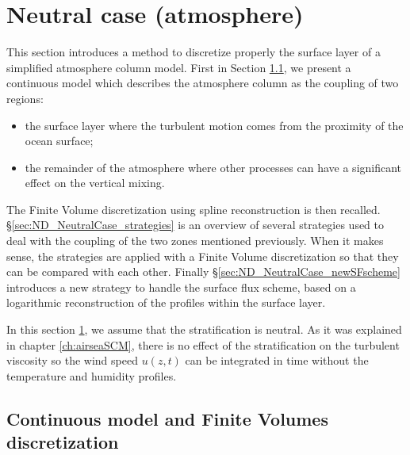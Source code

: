 \section{Neutral case (atmosphere)}
\label{sec:ND_NeutralCase}
This section introduces a method to discretize properly
the surface layer of a simplified atmosphere column model.
First in Section \ref{sec:ND_NeutralCase_continuousModel},
we present a continuous model which describes the atmosphere
column as the coupling of two regions:
\begin{itemize}
		\item the surface layer where the turbulent motion
			comes from the proximity of the ocean surface;
		\item the remainder of the atmosphere where other
			processes can have a significant effect
			on the vertical mixing.
\end{itemize}
The Finite Volume discretization using spline reconstruction
is then recalled.
\S \ref{sec:ND_NeutralCase_strategies}
is an overview of several strategies used to deal
with the coupling of the two zones mentioned previously.
When it makes sense, the strategies are applied with a
Finite Volume discretization so that they can be
compared with each other.
Finally \S \ref{sec:ND_NeutralCase_newSFscheme}
introduces a new strategy to handle the surface flux scheme,
based on a logarithmic reconstruction of the profiles
within the surface layer.
\par
In this section \ref{sec:ND_NeutralCase},
we assume that the stratification is neutral.
As it was explained in chapter \ref{ch:airseaSCM},
there is no effect of the stratification on the turbulent viscosity
so the wind speed $u(z, t)$ can be integrated in time
without the temperature and humidity profiles.
\subsection{Continuous model and Finite Volumes discretization}
\label{sec:ND_NeutralCase_continuousModel}
